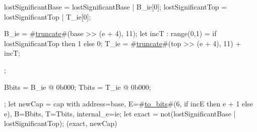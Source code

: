 {{{      lostSignificantBase = lostSignificantBase | B_ie[0];
      lostSignificantTop  = lostSignificantTop | T_ie[0];

      B_ie = #\hyperref[sailMIPSztruncate]{truncate}#(base >> (e + 4), 11);
      let incT : range(0,1) = if lostSignificantTop then 1 else 0;
      T_ie = #\hyperref[sailMIPSztruncate]{truncate}#(top >> (e + 4), 11) + incT;
    };

    Bbits = B_ie @ 0b000;
    Tbits = T_ie @ 0b000;
  };
  let newCap = {cap with address=base, E=#\hyperref[sailMIPSztozybits]{to\_bits}#(6, if incE then e + 1 else e), B=Bbits, T=Tbits, internal_e=ie};
  let exact = not(lostSignificantBase | lostSignificantTop);
  (exact, newCap)
}
